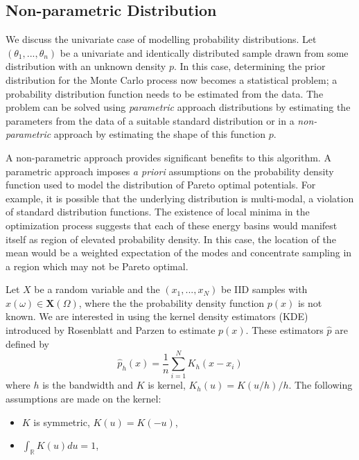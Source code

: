 \subsection{Non-parametric Distribution}
We discuss the univariate case of modelling probability distributions.
Let $(\theta_1,...,\theta_n)$ be a univariate and identically distributed sample drawn from some distribution with an unknown density $p$.
In this case, determining the prior distribution for the Monte Carlo process now becomes a statistical problem; a probability distribution function needs to be estimated from the data.  The problem can be solved using \emph{parametric} approach distributions by estimating the parameters from the data of a suitable standard distribution or in a \emph{non-parametric} approach by estimating the shape of this function $p$.

A non-parametric approach provides significant benefits to this algorithm.  A parametric approach imposes \emph{a priori} assumptions on the probability density function used to model the distribution of Pareto optimal potentials.  For example, it is possible that the underlying distribution is multi-modal, a violation of standard distribution functions.  The existence of local minima in the optimization process suggests that each of these energy basins would manifest itself as region of elevated probability density.  In this case, the location of the mean would be a weighted expectation of the modes and concentrate sampling in a region which may not be Pareto optimal.


Let $X$ be a random variable and the $(x_1,...,x_N)$ be IID samples with $x(\omega) \in \bm{X}(\Omega)$, where the the probability density function $p(x)$ is not known.  We are interested in using the kernel density estimators (KDE) introduced by Rosenblatt\cite{rosenblatt1956_kde} and Parzen\cite{parzen1962_kde} to estimate $p(x)$.   These estimators $\hat{p}$ are defined by
\begin{equation}
\label{eq:kde_univariate}
    \hat{p}_h(x) = \frac{1}{n} \sum_{i=1}^N K_h(x-x_i)
\end{equation}
where $h$ is the bandwidth and $K$ is kernel, $K_h(u)=K(u/h)/h$.  The following assumptions are made on the kernel:
\begin{itemize}
    \item $K$ is symmetric, $K(u)=K(-u)$,
    \item $\int_\mathbb{R} K(u)du = 1$,
\end{itemize}

